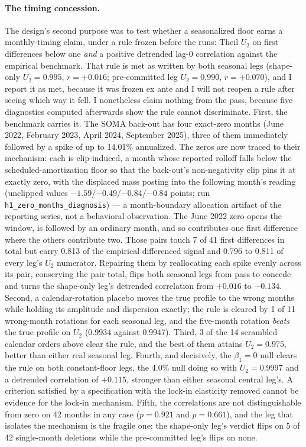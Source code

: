 \documentclass[12pt]{article}
\begin{document}
\paragraph{The timing concession.} The design's second purpose was to test whether a seasonalized floor earns a monthly-timing claim, under a rule frozen before the runs: Theil $U_2$ on first differences below one \emph{and} a positive detrended lag-0 correlation against the empirical benchmark. That rule is met as written by both seasonal legs (shape-only $U_2 = 0.995$, $r = +0.016$; pre-committed leg $U_2 = 0.990$, $r = +0.070$), and I report it as met, because it was frozen ex ante and I will not reopen a rule after seeing which way it fell. I nonetheless claim nothing from the pass, because five diagnostics computed afterwards show the rule cannot discriminate. First, the benchmark carries it. The SOMA back-out has four exact-zero months (June 2022, February 2023, April 2024, September 2025), three of them immediately followed by a spike of up to 14.01\% annualized. The zeros are now traced to their mechanism: each is clip-induced, a month whose reported rolloff falls below the scheduled-amortization floor so that the back-out's non-negativity clip pins it at exactly zero, with the displaced mass posting into the following month's reading (unclipped values $-1.59$/$-0.49$/$-0.84$/$-0.84$ points; run \texttt{h1\_zero\_months\_diagnosis}) --- a month-boundary allocation artifact of the reporting series, not a behavioral observation. The June 2022 zero opens the window, is followed by an ordinary month, and so contributes one first difference where the others contribute two. Those pairs touch 7 of 41 first differences in total but carry 0.813 of the empirical differenced signal and 0.796 to 0.811 of every leg's $U_2$ numerator. Repairing them by reallocating each spike evenly across its pair, conserving the pair total, flips both seasonal legs from pass to concede and turns the shape-only leg's detrended correlation from $+0.016$ to $-0.134$. Second, a calendar-rotation placebo moves the true profile to the wrong months while holding its amplitude and dispersion exactly; the rule is cleared by 1 of 11 wrong-month rotations for each seasonal leg, and the five-month rotation \emph{beats} the true profile on $U_2$ (0.9934 against 0.9947). Third, 3 of the 14 scrambled calendar orders above clear the rule, and the best of them attains $U_2 = 0.975$, better than either real seasonal leg. Fourth, and decisively, the $\beta_1 = 0$ null clears the rule on both constant-floor legs, the 4.0\% null doing so with $U_2 = 0.9997$ and a detrended correlation of $+0.115$, stronger than either seasonal central leg's. A criterion satisfied by a specification with the lock-in elasticity removed cannot be evidence for the lock-in mechanism. Fifth, the correlations are not distinguishable from zero on 42 months in any case ($p = 0.921$ and $p = 0.661$), and the leg that isolates the mechanism is the fragile one: the shape-only leg's verdict flips on 5 of 42 single-month deletions while the pre-committed leg's flips on none.
\end{document}
